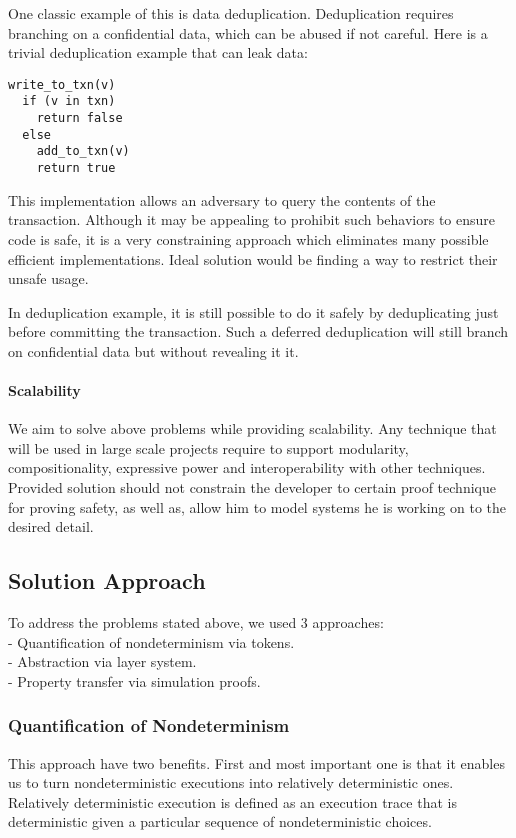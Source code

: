 \documentclass[onecolumn]{paper}
\begin{document}
One classic example of this is data deduplication. Deduplication requires branching on a confidential data, which can be abused if not careful. Here is a trivial deduplication example that can leak data:

\begin{lstlisting}
write_to_txn(v)
  if (v in txn)
    return false
  else
    add_to_txn(v)
    return true
\end{lstlisting}

This implementation allows an adversary to query the contents of the transaction. Although it may be appealing to prohibit such behaviors to ensure code is safe, it is a very constraining approach which eliminates many possible efficient implementations. Ideal solution would be finding a way to restrict their unsafe usage.

In deduplication example, it is still possible to do it safely by deduplicating just before committing the transaction. Such a deferred deduplication will still branch on confidential data but without revealing it it.

\paragraph{Scalability}
We aim to solve above problems while providing scalability. Any technique that will be used in large scale projects require to support modularity, compositionality, expressive power and interoperability with other techniques. Provided solution should not constrain the developer to certain proof technique for proving safety, as well as, allow him to model systems he is working on to the desired detail.

\subsection*{Solution Approach}
To address the problems stated above, we used 3 approaches:\\
- Quantification of nondeterminism via tokens.\\
- Abstraction via layer system.\\
- Property transfer via simulation proofs.

\subsubsection*{Quantification of Nondeterminism}
This approach have two benefits. First and most important one is that it enables us to
turn nondeterministic executions into relatively deterministic ones. 
Relatively deterministic execution is defined as an execution trace that is deterministic given a particular sequence of nondeterministic choices.\\
\end{document}
